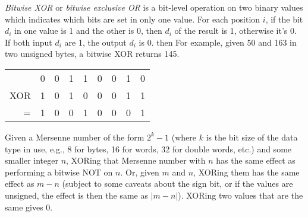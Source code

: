 \documentclass[12pt]{article}
\begin{document}
{\em Bitwise XOR} or {\em bitwise exclusive OR} is a bit-level operation on two binary values which indicates which bits are set in only one value. For each position $i$, if the bit $d_i$ in one value is 1 and the other is 0, then $d_i$ of the result is 1, otherwise it's 0. If both input $d_i$ are 1, the output $d_i$ is 0. then For example, given 50 and 163 in two unsigned bytes, a bitwise XOR returns 145.

\begin{tabular}{|r|c|c|c|c|c|c|c|c|}
    & 0 & 0 & 1 & 1 & 0 & 0 & 1 & 0 \\
XOR & 1 & 0 & 1 & 0 & 0 & 0 & 1 & 1 \\
  = & 1 & 0 & 0 & 1 & 0 & 0 & 0 & 1 \\
\end{tabular}

Given a Mersenne number of the form $2^k - 1$ (where $k$ is the bit size of the data type in use, e.g., 8 for bytes, 16 for words, 32 for double words, etc.) and some smaller integer $n$, XORing that Mersenne number with $n$ has the same effect as performing a bitwise NOT on $n$. Or, given $m$ and $n$, XORing them has the same effect as $m - n$ (subject to some caveats about the sign bit, or if the values are unsigned, the effect is then the same as $|m - n|$). XORing two values that are the same gives 0.
\end{document}
